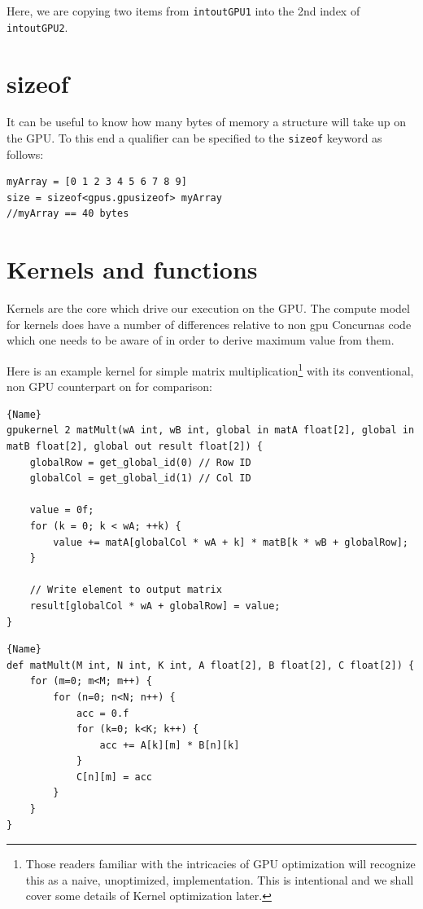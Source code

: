 \documentclass[conc-doc]{subfiles}
\begin{document}
Here, we are copying two items from \lstinline{intoutGPU1} into the 2nd index of \lstinline{intoutGPU2}.

\section{sizeof}
It can be useful to know how many bytes of memory a structure will take up on the GPU. To this end a qualifier can be specified to the \lstinline{sizeof} keyword as follows:

\begin{lstlisting}
myArray = [0 1 2 3 4 5 6 7 8 9]
size = sizeof<gpus.gpusizeof> myArray 
//myArray == 40 bytes
\end{lstlisting}

\section{Kernels and functions}
Kernels are the core which drive our execution on the GPU. The compute model for kernels does have a number of differences relative to non gpu Concurnas code which one needs to be aware of in order to derive maximum value from them.

Here is an example kernel for simple matrix multiplication\footnote{Those readers familiar with the intricacies of GPU optimization will recognize this as a naive, unoptimized, implementation. This is intentional and we shall cover some details of Kernel optimization later.} with its conventional, non GPU counterpart on for comparison:

\noindent\begin{minipage}{.45\textwidth}
	\begin{lstlisting}[caption=GPU kernel,frame=tlrb]{Name}
gpukernel 2 matMult(wA int, wB int, global in matA float[2], global in matB float[2], global out result float[2]) {
	globalRow = get_global_id(0) // Row ID
	globalCol = get_global_id(1) // Col ID
	
	value = 0f;
	for (k = 0; k < wA; ++k) {
		value += matA[globalCol * wA + k] * matB[k * wB + globalRow];
	}
	
	// Write element to output matrix
	result[globalCol * wA + globalRow] = value;
}
\end{lstlisting}
\end{minipage}\hfill
\begin{minipage}{.45\textwidth}
	\begin{lstlisting}[caption=CPU equivilent,frame=tlrb]{Name}
def matMult(M int, N int, K int, A float[2], B float[2], C float[2]) {
	for (m=0; m<M; m++) {
		for (n=0; n<N; n++) {
			acc = 0.f
			for (k=0; k<K; k++) {
				acc += A[k][m] * B[n][k]
			}
			C[n][m] = acc
		}
	}
}
\end{lstlisting}
\end{minipage}
\end{document}
